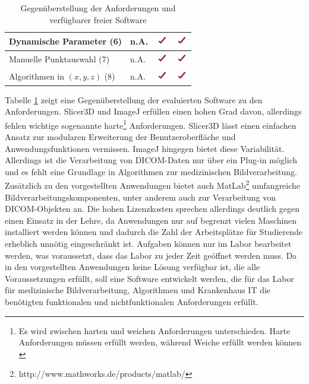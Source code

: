 \begin{table}
\begin{tabularx}{\textwidth}{|p{7cm}|X|X|X|}
    Dynamische Parameter (6)						& n.A.				& \includegraphics[width=0.5cm]{./img/yes.pdf}  		  		& \includegraphics[width=0.5cm]{./img/yes.pdf}  \\ \hline
    Manuelle Punktauswahl (7)		 				& n.A.				& \includegraphics[width=0.5cm]{./img/yes.pdf}		  		& \includegraphics[width=0.5cm]{./img/yes.pdf} \\ \hline
    Algorithmen in $(x, y, z)$ (8)					& n.A.& \includegraphics[width=0.5cm]{./img/yes.pdf}  &  \includegraphics[width=0.5cm]{./img/yes.pdf} \\ \hline
    
    \bottomrule
    \end{tabularx}
    \caption {Gegenüberstellung der Anforderungen und verfügbarer freier Software}
    \label{table:anforderungen}
\end{table}

Tabelle \ref{table:anforderungen} zeigt eine Gegenüberstellung der evaluierten Software zu den Anforderungen. Slicer3D und ImageJ erfüllen einen hohen Grad davon, allerdings fehlen wichtige sogenannte harte\footnote{Es wird zwischen harten und weichen Anforderungen unterschieden. Harte Anforderungen müssen erfüllt werden, während Weiche erfüllt werden können \cite[9]{balzert:swa}} Anforderungen. Slicer3D lässt einen einfachen Ansatz zur modularen Erweiterung der Benutzeroberfläche und Anwendungsfunktionen vermissen. ImageJ hingegen bietet diese Variabilität. Allerdings ist die Verarbeitung von DICOM-Daten nur über ein Plug-in möglich und es fehlt eine Grundlage in Algorithmen zur medizinischen Bildverarbeitung. Zusätzlich zu den vorgestellten Anwendungen bietet auch MatLab\footnote{http://www.mathworks.de/products/matlab/} umfangreiche Bildverarbeitungskomponenten, unter anderem auch zur Verarbeitung von DICOM-Objekten an. Die hohen Lizenzkosten sprechen allerdings deutlich gegen einen Einsatz in der Lehre, da Anwendungen nur auf begrenzt vielen Maschinen installiert werden können und dadurch die Zahl der Arbeitsplätze für Studierende erheblich unnötig eingeschränkt ist. Aufgaben können nur im Labor bearbeitet werden, was voraussetzt, dass das Labor zu jeder Zeit geöffnet werden muss.
Da in den vorgestellten Anwendungen keine Lösung verfügbar ist, die alle Voraussetzungen erfüllt, soll eine Software entwickelt werden, die für das Labor für medizinische Bildverarbeitung, Algorithmen und Krankenhaus IT die benötigten funktionalen und nichtfunktionalen Anforderungen erfüllt.